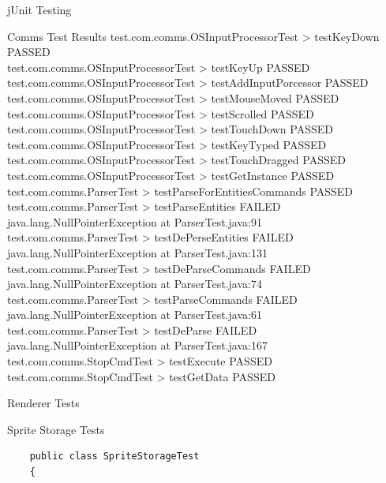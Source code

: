 \documentclass[12pt]{report}
\begin{document}
\begin{chapter}{jUnit Testing}
\begin{section}{Comms Test Results}
  	test.com.comms.OSInputProcessorTest > testKeyDown PASSED\\
  	test.com.comms.OSInputProcessorTest > testKeyUp PASSED\\
  	test.com.comms.OSInputProcessorTest > testAddInputPorcessor PASSED\\
  	test.com.comms.OSInputProcessorTest > testMouseMoved PASSED\\
  	test.com.comms.OSInputProcessorTest > testScrolled PASSED\\
	test.com.comms.OSInputProcessorTest > testTouchDown PASSED\\
	test.com.comms.OSInputProcessorTest > testKeyTyped PASSED\\
	test.com.comms.OSInputProcessorTest > testTouchDragged PASSED\\
	test.com.comms.OSInputProcessorTest > testGetInstance PASSED\\
	test.com.comms.ParserTest > testParseForEntitiesCommands PASSED\\
	test.com.comms.ParserTest > testParseEntities FAILED\\
    	\hspace{4ex}java.lang.NullPointerException at ParserTest.java:91\\
	test.com.comms.ParserTest > testDePerseEntities FAILED\\
    	\hspace{4ex}java.lang.NullPointerException at ParserTest.java:131\\
	test.com.comms.ParserTest > testDeParseCommands FAILED\\
    	\hspace{4ex}java.lang.NullPointerException at ParserTest.java:74\\
	test.com.comms.ParserTest > testParseCommands FAILED\\
    	\hspace{4ex}java.lang.NullPointerException at ParserTest.java:61\\
	test.com.comms.ParserTest > testDeParse FAILED\\
    	\hspace{4ex}java.lang.NullPointerException at ParserTest.java:167\\
	test.com.comms.StopCmdTest > testExecute PASSED\\
	test.com.comms.StopCmdTest > testGetData PASSED\\
  \end{section}
  
  
  \begin{section}{Renderer Tests}
   \begin{subsection}{Sprite Storage Tests}
    \begin{lstlisting}
    public class SpriteStorageTest
    {


\end{lstlisting}
\end{subsection}
\end{section}
\end{chapter}
\end{document}

